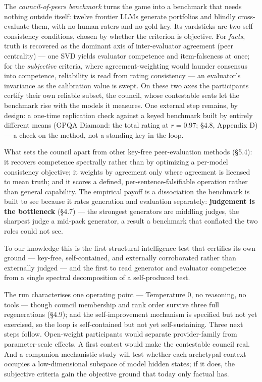 The \emph{council-of-peers benchmark} turns the game into a benchmark that needs nothing outside itself: twelve frontier LLMs generate portfolios and blindly cross-evaluate them, with no human raters and no gold key. Its yardsticks are two self-consistency conditions, chosen by whether the criterion is objective. For \emph{facts}, truth is recovered as the dominant axis of inter-evaluator agreement (peer centrality) --- one SVD yields evaluator competence and item-falseness at once; for the \emph{subjective} criteria, where agreement-weighting would launder consensus into competence, reliability is read from rating consistency --- an evaluator's invariance as the calibration value is swept. On these two axes the participants certify their own reliable subset, the council, whose contestable seats let the benchmark rise with the models it measures. One external step remains, by design: a one-time replication check against a keyed benchmark built by entirely different means (GPQA Diamond: the total rating at \(r = 0.97\); §4.8, Appendix D) --- a check on the method, not a standing key in the loop.

What sets the council apart from other key-free peer-evaluation methods (§5.4): it recovers competence spectrally rather than by optimizing a per-model consistency objective; it weights by agreement only where agreement is licensed to mean truth; and it scores a defined, per-sentence-falsifiable operation rather than general capability. The empirical payoff is a dissociation the benchmark is built to see because it rates generation and evaluation separately: \textbf{judgement is the bottleneck} (§4.7) --- the strongest generators are middling judges, the sharpest judge a mid-pack generator, a result a benchmark that conflated the two roles could not see.

To our knowledge this is the first structural-intelligence test that certifies its own ground --- key-free, self-contained, and externally corroborated rather than externally judged --- and the first to read generator and evaluator competence from a single spectral decomposition of a self-produced test.

The run characterises one operating point --- Temperature 0, no reasoning, no tools --- though council membership and rank order survive three full regenerations (§4.9); and the self-improvement mechanism is specified but not yet exercised, so the loop is self-contained but not yet self-sustaining. Three next steps follow. Open-weight participants would separate provider-family from parameter-scale effects. A first contest would make the contestable council real. And a companion mechanistic study will test whether each archetypal context occupies a low-dimensional subspace of model hidden states; if it does, the subjective criteria gain the objective ground that today only factual has.

